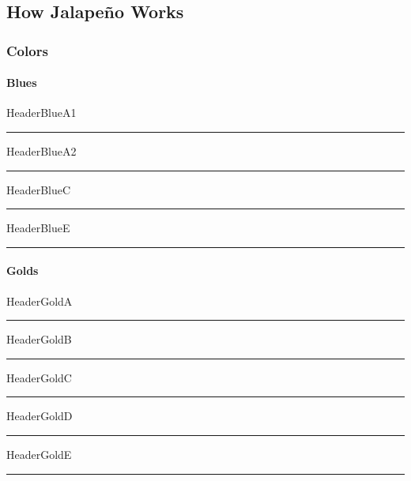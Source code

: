 \documentclass[class=book , crop=false]{standalone}
\title{}  %
\begin{document}

\ifstandalone
\frontmatter %
\maketitle %
\tableofcontents %
\clearpage
\mainmatter %
\fi

\subsection[How Jalape\~no Works]{\large How \LARGE Jalape\~no \large Works}
\subsubsection{Colors}
%
\paragraph[Blues]{Blues\texorpdfstring{\\}{}}
\textcolor{HeaderBlueA1}{HeaderBlueA1}
\noindent\textcolor{HeaderBlueA1}{\rule{.5\textwidth}{.5mm}}
\textcolor{HeaderBlueA2}{HeaderBlueA2}
\noindent\textcolor{HeaderBlueA2}{\rule{.5\textwidth}{.5mm}}
\textcolor{HeaderBlueC}{HeaderBlueC}
\noindent\textcolor{HeaderBlueC}{\rule{.5\textwidth}{.5mm}}
\textcolor{HeaderBlueE}{HeaderBlueE}
\noindent\textcolor{HeaderBlueE}{\rule{.5\textwidth}{.5mm}}
%
\paragraph[Golds]{Golds\texorpdfstring{\\}{}}
\textcolor{HeaderGoldA}{HeaderGoldA}
\noindent\textcolor{HeaderGoldA}{\rule{.5\textwidth}{.5mm}}
\textcolor{HeaderGoldB}{HeaderGoldB}
\noindent\textcolor{HeaderGoldB}{\rule{.5\textwidth}{.5mm}}
\textcolor{HeaderGoldC}{HeaderGoldC}
\noindent\textcolor{HeaderGoldC}{\rule{.5\textwidth}{.5mm}}
\textcolor{HeaderGoldD}{HeaderGoldD}
\noindent\textcolor{HeaderGoldD}{\rule{.5\textwidth}{.5mm}}
\textcolor{HeaderGoldE}{HeaderGoldE}
\noindent\textcolor{HeaderGoldE}{\rule{.5\textwidth}{.5mm}}
%
\end{document}
